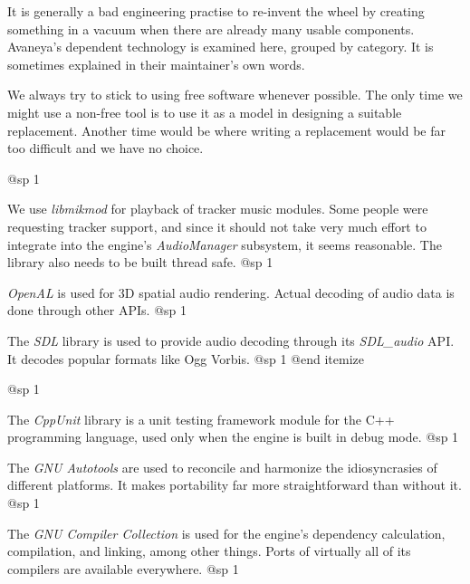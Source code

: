 

It is generally a bad engineering practise to re-invent the wheel by creating something in a vacuum when there are already many usable components. Avaneya's dependent technology is examined here, grouped by category. It is sometimes explained in their maintainer's own words.

We always try to stick to using free software whenever possible. The only time we might use a non-free tool is to use it as a model in designing a suitable replacement. Another time would be where writing a replacement would be far too difficult and we have no choice.

@sp 1

\itemize
\item
We use {\it libmikmod} for playback of tracker music modules. Some people were requesting tracker support, and since it should not take very much effort to integrate into the engine's {\it AudioManager} subsystem, it seems reasonable. The library also needs to be built thread safe.
@sp 1

\item
{\it OpenAL} is used for 3D spatial audio rendering. Actual decoding of audio data is done through other APIs.
@sp 1

\item
The {\it SDL} library is used to provide audio decoding through its {\it SDL_audio} API. It decodes popular formats like Ogg Vorbis.
@sp 1
@end itemize

@sp 1

\itemize
\item
The {\it CppUnit} library is a unit testing framework module for the C++ programming language, used only when the engine is built in debug mode.
@sp 1

\item
The {\it GNU Autotools} are used to reconcile and harmonize the idiosyncrasies of different platforms. It makes portability far more straightforward than without it.
@sp 1

\item
The {\it GNU Compiler Collection} is used for the engine's dependency calculation, compilation, and linking, among other things. Ports of virtually all of its compilers are available everywhere.
@sp 1

